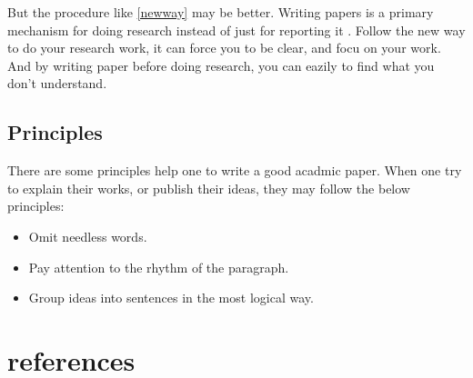 \documentclass{article}
\begin{document}
But the procedure like \ref{newway} may be better.
Writing papers is a primary mechanism for doing research instead of just for reporting it \cite{AGreatResearchPaper}.
Follow the new way to do your research work, it can force you to be clear, 
and focu on your work.
And by writing paper before doing research, you can eazily to find what you don't understand.

\subsection{Principles}
There are some principles help one to write a good acadmic paper.
When one try to explain their works, or publish their ideas, 
they may follow the below principles:
\begin{itemize}
    \item Omit needless words.
    \item Pay attention to the rhythm of the paragraph.
    \item Group ideas into sentences in the most logical way.
\end{itemize}

\section{references}

\printbibliography
\end{document}
